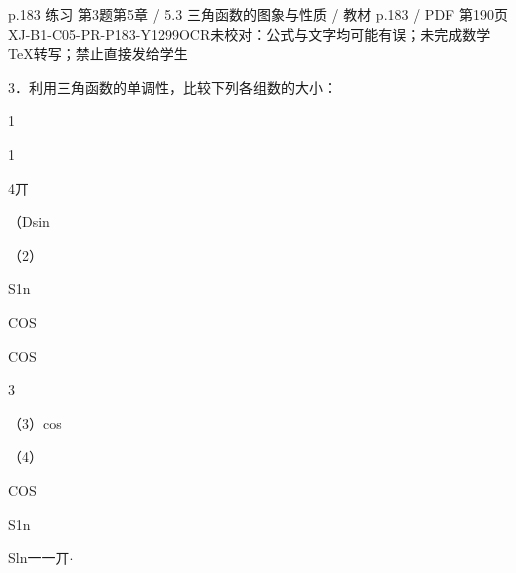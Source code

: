 \begin{bankitem}{p.183 练习 第3题}{第5章 / 5.3 三角函数的图象与性质 / 教材 p.183 / PDF 第190页}{XJ-B1-C05-PR-P183-Y1299}{OCR未校对：公式与文字均可能有误；未完成数学TeX转写；禁止直接发给学生}
\begin{ocrdraft}
\par
3．利用三角函数的单调性，比较下列各组数的大小：
\par
1
\par
1
\par
4丌
\par
（Dsin
\par
（2）
\par
S1n
\par
COS
\par
COS
\par
3
\par
（3）cos
\par
（4）
\par
COS
\par
S1n
\par
Sln一一丌\ensuremath{\cdot}
\end{ocrdraft}
\end{bankitem}
